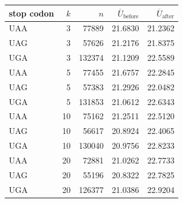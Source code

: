 \begin{center}
\small
\setlength{\tabcolsep}{6pt}
\renewcommand{\arraystretch}{1.15}
\begin{tabular}{lrrrr}
\toprule
stop codon & $k$ & $n$ & $\overline{U}_{\mathrm{before}}$ & $\overline{U}_{\mathrm{after}}$ \\
\midrule
UAA & 3 & 77889 & 21.6830 & 21.2362 \\
UAG & 3 & 57626 & 21.2176 & 21.8375 \\
UGA & 3 & 132374 & 21.1209 & 22.5589 \\
UAA & 5 & 77455 & 21.6757 & 22.2845 \\
UAG & 5 & 57383 & 21.2926 & 22.0482 \\
UGA & 5 & 131853 & 21.0612 & 22.6343 \\
UAA & 10 & 75162 & 21.2511 & 22.5120 \\
UAG & 10 & 56617 & 20.8924 & 22.4065 \\
UGA & 10 & 130040 & 20.9756 & 22.8233 \\
UAA & 20 & 72881 & 21.0262 & 22.7733 \\
UAG & 20 & 55196 & 20.8322 & 22.7825 \\
UGA & 20 & 126377 & 21.0386 & 22.9204 \\
\bottomrule
\end{tabular}
\end{center}

